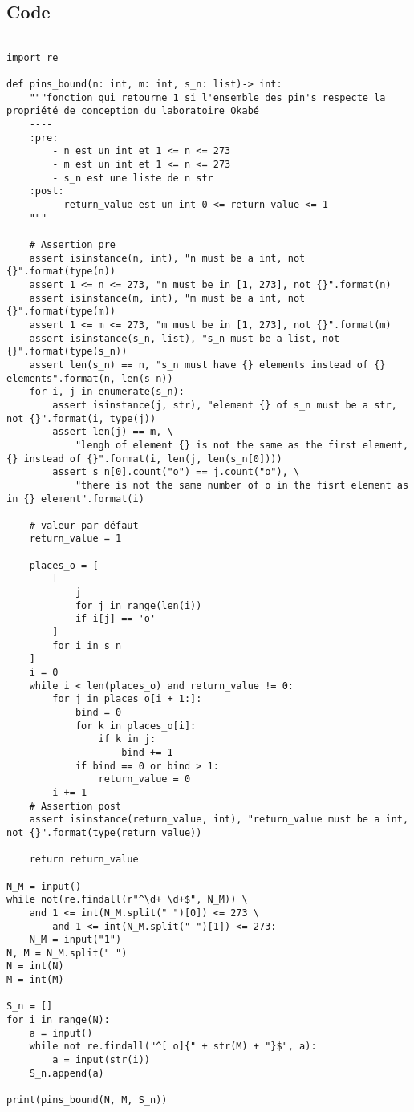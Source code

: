 \documentclass{article}
\begin{document}
        \subsection{Code}
            \begin{verbatim}

import re

def pins_bound(n: int, m: int, s_n: list)-> int:
    """fonction qui retourne 1 si l'ensemble des pin's respecte la propriété de conception du laboratoire Okabé
    ----
    :pre:
        - n est un int et 1 <= n <= 273
        - m est un int et 1 <= n <= 273
        - s_n est une liste de n str
    :post:
        - return_value est un int 0 <= return value <= 1
    """

    # Assertion pre
    assert isinstance(n, int), "n must be a int, not {}".format(type(n))
    assert 1 <= n <= 273, "n must be in [1, 273], not {}".format(n)
    assert isinstance(m, int), "m must be a int, not {}".format(type(m))
    assert 1 <= m <= 273, "m must be in [1, 273], not {}".format(m)
    assert isinstance(s_n, list), "s_n must be a list, not {}".format(type(s_n))
    assert len(s_n) == n, "s_n must have {} elements instead of {} elements".format(n, len(s_n))
    for i, j in enumerate(s_n):
        assert isinstance(j, str), "element {} of s_n must be a str, not {}".format(i, type(j))
        assert len(j) == m, \
            "lengh of element {} is not the same as the first element, {} instead of {}".format(i, len(j, len(s_n[0])))
        assert s_n[0].count("o") == j.count("o"), \
            "there is not the same number of o in the fisrt element as in {} element".format(i)

    # valeur par défaut
    return_value = 1

    places_o = [
        [
            j
            for j in range(len(i))
            if i[j] == 'o'
        ]
        for i in s_n
    ]
    i = 0
    while i < len(places_o) and return_value != 0:
        for j in places_o[i + 1:]:
            bind = 0
            for k in places_o[i]:
                if k in j:
                    bind += 1
            if bind == 0 or bind > 1:
                return_value = 0
        i += 1
    # Assertion post
    assert isinstance(return_value, int), "return_value must be a int, not {}".format(type(return_value))

    return return_value

N_M = input()
while not(re.findall(r"^\d+ \d+$", N_M)) \
    and 1 <= int(N_M.split(" ")[0]) <= 273 \
        and 1 <= int(N_M.split(" ")[1]) <= 273:
    N_M = input("1")
N, M = N_M.split(" ")
N = int(N)
M = int(M)

S_n = []
for i in range(N):
    a = input()
    while not re.findall("^[ o]{" + str(M) + "}$", a):
        a = input(str(i))
    S_n.append(a)

print(pins_bound(N, M, S_n))

            \end{verbatim}
\end{document}
